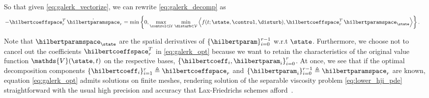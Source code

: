 %

So that given \eqref{eq:galerk_vectorize}, we can rewrite \eqref{eq:galerk_decomp} as 
%
\begin{align}
	-\hilbertcoeffspace_r^T \, \dot{\hilbertparamspace}_r  &= \min \left\{0, \max_{\control \in \mathcal{U}} \, \min_{\disturb \in \mathcal{V}} \left\langle f(t; \state, \control, \disturb),  \hilbertcoeffspace_r^T \, \hilbertparamspace_{\state}\right\rangle \right\}. %
	\label{eq:galerk_opt}
\end{align}

%
%

\begin{remark}
	Note that $\hilbertparamspace_{\state}$ are the spatial derivatives of $\{\hilbertparam\}_{i=0}^{r-1}$ w.r.t $\state$. Furthermore, we choose not to cancel out the coefficients $\hilbertcoeffspace_r^T$ in \eqref{eq:galerk_opt} because we want to retain the characteristics of the original value function $\mathds{V}(\state, t)$ on the respective bases, $\left\{\hilbertcoeff_i, \hilbertparam_i\right\}_{i=0}^{r}$. At once, we see that if the optimal decomposition components $\{\hilbertcoeff_i\}_{i=1}^r \triangleq \hilbertcoeffspace_r$ and $\{\hilbertparam_i\}_{i=0}^{r-1} \triangleq \hilbertparamspace_r$ are known, equation \eqref{eq:galerk_opt} admits solutions  on finite meshes, rendering solution of the separable viscosity problem \eqref{eq:lower_hji_pde} straightforward  with the usual high precision and accuracy that Lax-Friedrichs schemes afford~\cite{CrandallLaxFriedrichs, CrandallFractional, Crandall1984, OsherShuENO}. 
\end{remark}


